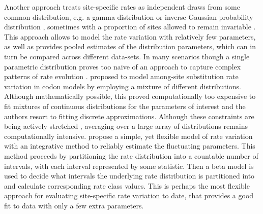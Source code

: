 Another approach treats site-specific rates as independent draws from some common distribution, e.g. a gamma distribution \citep{Yang1993} or inverse Gaussian probability distribution \citep{Waddell1997}, sometimes with a proportion of sites allowed to remain invariable \citep{Gu1995}.
This approach allows to model the rate variation with relatively few parameters, as well as provides pooled estimates of the distribution parameters, which can in turn be compared across different data-sets.  
In many scenarios though a single parametric distribution proves too naive of an approach to capture complex patterns of rate evolution \citep{Pond2005a}.
\cite{Yang2000} proposed to model among-site substitution rate variation in codon models by employing a mixture of different distributions.
Although mathematically possible, this proved computationally too expensive to fit mixtures of continuous distributions for the parameters of interest and the authors resort to fitting discrete approximations.
Although these constraints are being actively stretched \citep{Suchard2009,Ayres2012}, averaging over a large array of distributions remains computationally intensive. 
\citet{Pond2005a} propose a simple, yet flexible model of rate variation with an integrative method to reliably estimate the fluctuating parameters.
This method proceeds by partitioning the rate distribution into a countable number of intervals, with each interval represented by some statistic.
Then a beta model is used to decide what intervals the underlying rate distribution is partitioned into and calculate corresponding rate class values.
This is perhaps the most flexible approach for evaluating site-specific rate variation to date, that provides a good fit to data with only a few extra parameters.


